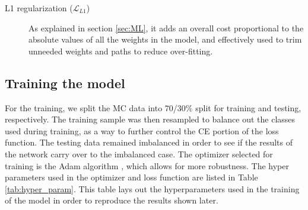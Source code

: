 \begin{description}
	\item [L1 regularization ($\mathcal{L}_{L1}$)] As explained in section \ref{sec:ML}, it adds an overall cost proportional to the absolute values of all the weights in the model, and effectively used to trim unneeded weights and paths to reduce over-fitting.
	
\end{description}


\subsection{Training the model}
For the training, we split the MC data into 70/30\% split for training and testing, respectively. The training sample was then resampled to balance out the classes used during training, as a way to further control the CE portion of the loss function. The testing data remained imbalanced in order to see if the results of the network carry over to the imbalanced case. The optimizer selected for training is the Adam algorithm \cite{kingma_adam_2017}, which allows for more robustness. The hyper parameters used in the optimizer and loss function are listed in Table \ref{tab:hyper_param}. This table lays out the hyperparameters used in the training of the model in order to reproduce the results shown later.





